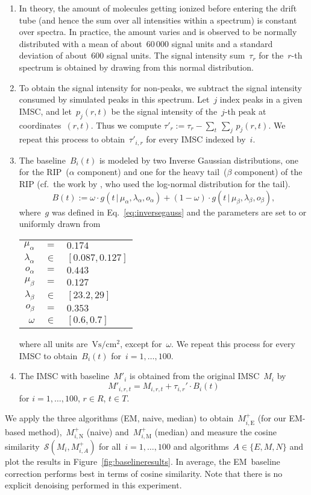 \documentclass{article}
\newcommand{\given}{\,|\,}
\begin{document}
\begin{enumerate}
\item In theory, the amount of molecules getting ionized before entering the drift tube (and hence the sum over all intensities within a spectrum) is constant over spectra.
In practice, the amount varies and is observed to be normally distributed with a mean of about~$60\,000$ signal units and a standard deviation of about~$600$ signal units.
The signal intensity sum~$\tau_{r}$ for the~$r$-th spectrum is obtained by drawing from this normal distribution.
\item To obtain the signal intensity for non-peaks, we subtract the signal intensity consumed by simulated peaks in this spectrum. 
Let~$j$ index peaks in a given IMSC, and let~$p_{j}(r,t)$ be the signal intensity of the~$j$-th peak at coordinates~$(r,t)$.
Thus we compute $\tau'_r := \tau_r - \sum_{t}\, \sum_{j}\, p_j(r,t)$.
We repeat this process to obtain~$\tau'_{i,r}$ for every IMSC indexed by~$i$.
\item The baseline~$B_i(t)$ is modeled by two Inverse Gaussian distributions, one for the RIP~($\alpha$ component) and one for the heavy tail~($\beta$ component) of the RIP (cf.\ the work by \cite{bader2008preprocessing}, who used the log-normal distribution for the tail).
\[
B(t) := \omega \cdot g(t \given \mu_{\alpha}, \lambda_{\alpha}, o_{\alpha}) + (1 - \omega) \cdot g(t \given \mu_{\beta}, \lambda_{\beta}, o_{\beta}),
\]
where~$g$ was defined in Eq.~\eqref{eq:inversegauss} and the parameters are set to or uniformly drawn from
\begin{center}\begin{tabular}{r@{ }c@{ }l}
$\mu_{\alpha}$ & $=$ & $0.174$\\
$\lambda_{\alpha}$ & $\in$ & $[0.087, 0.127]$\\
$o_{\alpha}$ & $=$ & $0.443$\\
$\mu_{\beta}$ & $=$ & $0.127$ \\
$\lambda_{\beta}$ & $\in$ & $[23.2, 29]$\\
$o_{\beta}$ & $=$ & $0.353$\\
$\omega$ & $\in$ & $[0.6, 0.7]$\\
\end{tabular}\end{center}
where all units are~$\text{Vs}/\text{cm}^2$, except for~$\omega$. We repeat this process for every IMSC to obtain~$B_i(t)$ for~$i=1,\dots,100$.
\item The IMSC with baseline~$M'_i$ is obtained from the original IMSC~$M_i$ by
\[
M'_{i,r,t} = M_{i,r,t} + \tau_{i,r}' \cdot B_i(t)
\]
for $i=1,\dots,100$, $r\in R$, $t\in T$.
\end{enumerate}
We apply the three algorithms (EM, naive, median) to obtain~$M^+_{i,\text{E}}$ (for our EM-based method),~$M^+_{i,\text{N}}$ (naive) and~$M^+_{i,\text{M}}$ (median) and measure the cosine similarity~$\mathcal{S}(M_i, M^+_{i,A})$ for all~$i=1,\dots,100$ and algorithms~$A\in\{E,M,N\}$ and plot the results in Figure~\ref{fig:baselineresults}.
In average, the EM~baseline correction performs best in terms of cosine similarity.
Note that there is no explicit denoising performed in this experiment.
\end{document}
